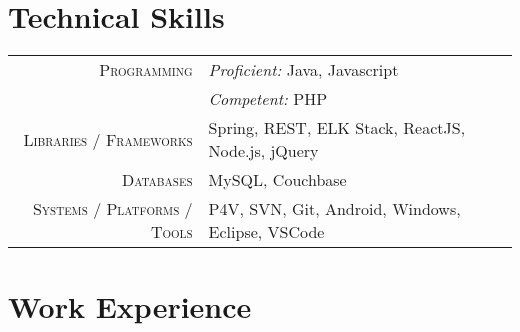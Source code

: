 \documentclass[a4paper,10pt]{extarticle} %
\begin{document}

\section{\textcolor{primary}{Technical Skills}}

\begin{tabular}{r|p{15cm}}

\textsc{Programming} & \textit{Proficient:} Java, Javascript\\
& \textit{Competent:} PHP \\
\textsc{Libraries / Frameworks} & Spring, REST, ELK Stack, ReactJS, Node.js, jQuery \\
\textsc{Databases} & MySQL, Couchbase\\
\textsc{Systems / Platforms / Tools} & P4V, SVN, Git, Android, Windows, Eclipse, VSCode\\

\end{tabular}





\section{\textcolor{primary}{Work Experience}}
\end{document}
